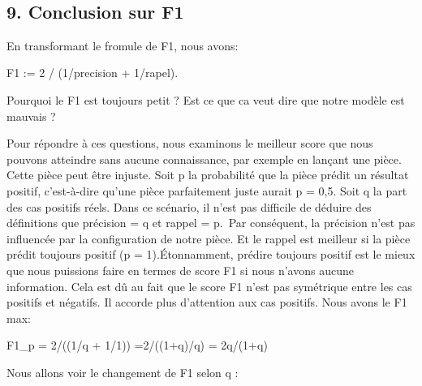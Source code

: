 \documentclass[11pt]{article}
\begin{document}
    \begin{center}
    \end{center}
    { \hspace*{\fill} \\}
    
    \hypertarget{conclusion-sur-f1}{%
\subsection{9. Conclusion sur F1}\label{conclusion-sur-f1}}

    En transformant le fromule de F1, nous avons:

F1 := 2 / (1/precision + 1/rapel).

Pourquoi le F1 est toujours petit ? Est ce que ca veut dire que notre
modèle est mauvais ?

Pour répondre à ces questions, nous examinons le meilleur score que nous
pouvons atteindre sans aucune connaissance, par exemple en lançant une
pièce. Cette pièce peut être injuste. Soit p la probabilité que la pièce
prédit un résultat positif, c'est-à-dire qu'une pièce parfaitement juste
aurait p = 0,5. Soit q la part des cas positifs réels. Dans ce scénario,
il n'est pas difficile de déduire des définitions que précision = q et
rappel = p.~Par conséquent, la précision n'est pas influencée par la
configuration de notre pièce. Et le rappel est meilleur si la pièce
prédit toujours positif (p = 1).Étonnamment, prédire toujours positif
est le mieux que nous puissions faire en termes de score F1 si nous
n'avons aucune information. Cela est dû au fait que le score F1 n'est
pas symétrique entre les cas positifs et négatifs. Il accorde plus
d'attention aux cas positifs. Nous avons le F1 max:

F1\_p = 2/((1/q + 1/1)) =2/((1+q)/q) = 2q/(1+q)

Nous allons voir le changement de F1 selon q :
\end{document}
